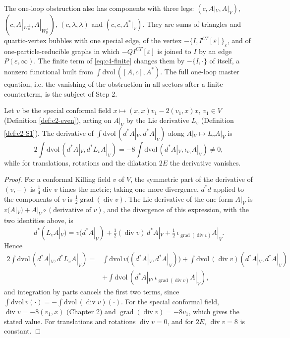\begin{remark}
\label{rem:c4-cubic}
The one-loop obstruction also has components with three legs: $(c,A|_V,A|_V)$, $(c,A|_{W_{\mathbb R}^\perp},A|_{W_{\mathbb R}^\perp})$, $(c,\lambda,\lambda)$ and $(c,c,A^*|_V)$. They are sums of triangles and quartic-vertex bubbles with one special edge, of the vertex $-\{I,I^{CT}[\varepsilon]\}_\varepsilon$, and of one-particle-reducible graphs in which $-QI^{CT}[\varepsilon]$ is joined to $I$ by an edge $P(\varepsilon,\infty)$. The finite term of \eqref{eq:c4-finite} changes them by $-\{I,\cdot\}$ of itself, a nonzero functional built from $\int\mathrm{dvol}\,([A,c],A^*)$. The full one-loop master equation, i.e. the vanishing of the obstruction in all sectors after a finite counterterm, is the subject of Step 2.
\end{remark}

\begin{proposition}
\label{prop:c4-K}
Let $v$ be the special conformal field $x\mapsto(x,x)v_1-2(v_1,x)x$, $v_1\in V$ (Definition \ref{def:c2-even}), acting on $A|_V$ by the Lie derivative $L_v$ (Definition \ref{def:c2-S1}). The derivative of $\int\mathrm{dvol}\,(d^*A|_V,d^*A|_V)$ along $A|_V\mapsto L_vA|_V$ is
\[
2\int\mathrm{dvol}\,(d^*A|_V,d^*L_vA|_V)=-8\int\mathrm{dvol}\,(d^*A|_V,\iota_{v_1}A|_V)\neq0,
\]
while for translations, rotations and the dilatation $2E$ the derivative vanishes.
\end{proposition}

\begin{proof}
For a conformal Killing field $v$ of $V$, the symmetric part of the derivative of $(v,-)$ is $\tfrac14\operatorname{div}v$ times the metric; taking one more divergence, $d^*d$ applied to the components of $v$ is $\tfrac12\operatorname{grad}(\operatorname{div}v)$. The Lie derivative of the one-form $A|_V$ is $v(A|_V)+A|_V\circ(\text{derivative of }v)$, and the divergence of this expression, with the two identities above, is
\[
d^*(L_vA|_V)=v(d^*A|_V)+\tfrac12(\operatorname{div}v)\,d^*A|_V+\tfrac12\,\iota_{\operatorname{grad}(\operatorname{div}v)}A|_V .
\]
Hence
\[
\begin{aligned}
2\int\mathrm{dvol}\,(d^*A|_V,d^*L_vA|_V)={}&\int\mathrm{dvol}\,v\big((d^*A|_V,d^*A|_V)\big)+\int\mathrm{dvol}\,(\operatorname{div}v)(d^*A|_V,d^*A|_V)\\
&+\int\mathrm{dvol}\,(d^*A|_V,\iota_{\operatorname{grad}(\operatorname{div}v)}A|_V),
\end{aligned}
\]
and integration by parts cancels the first two terms, since $\int\mathrm{dvol}\,v(\cdot)=-\int\mathrm{dvol}\,(\operatorname{div}v)(\cdot)$. For the special conformal field, $\operatorname{div}v=-8(v_1,x)$ (Chapter 2) and $\operatorname{grad}(\operatorname{div}v)=-8v_1$, which gives the stated value. For translations and rotations $\operatorname{div}v=0$, and for $2E$, $\operatorname{div}v=8$ is constant.
\end{proof}

